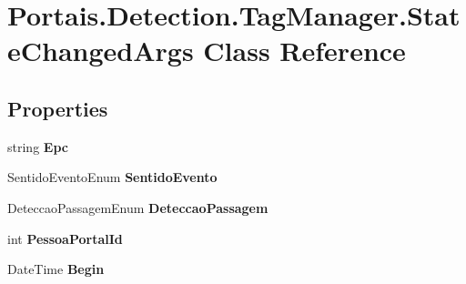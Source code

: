 \hypertarget{class_portais_1_1_detection_1_1_tag_manager_1_1_state_changed_args}{}\section{Portais.\+Detection.\+Tag\+Manager.\+State\+Changed\+Args Class Reference}
\label{class_portais_1_1_detection_1_1_tag_manager_1_1_state_changed_args}
\subsection*{Properties}
\begin{DoxyCompactItemize}
\item 
string {\bfseries Epc}\hypertarget{class_portais_1_1_detection_1_1_tag_manager_1_1_state_changed_args_ab162af2d831b001e3a7a2dbc318d6e7f}{}\label{class_portais_1_1_detection_1_1_tag_manager_1_1_state_changed_args_ab162af2d831b001e3a7a2dbc318d6e7f}

\item 
Sentido\+Evento\+Enum {\bfseries Sentido\+Evento}\hypertarget{class_portais_1_1_detection_1_1_tag_manager_1_1_state_changed_args_ad5ae6d50b904700d75226daad2cd1460}{}\label{class_portais_1_1_detection_1_1_tag_manager_1_1_state_changed_args_ad5ae6d50b904700d75226daad2cd1460}

\item 
Deteccao\+Passagem\+Enum {\bfseries Deteccao\+Passagem}\hypertarget{class_portais_1_1_detection_1_1_tag_manager_1_1_state_changed_args_a9c11a67657fe00c06f03f4910019065e}{}\label{class_portais_1_1_detection_1_1_tag_manager_1_1_state_changed_args_a9c11a67657fe00c06f03f4910019065e}

\item 
int {\bfseries Pessoa\+Portal\+Id}\hypertarget{class_portais_1_1_detection_1_1_tag_manager_1_1_state_changed_args_a93de763447b3f3cc88219b8e0e19b13d}{}\label{class_portais_1_1_detection_1_1_tag_manager_1_1_state_changed_args_a93de763447b3f3cc88219b8e0e19b13d}

\item 
Date\+Time {\bfseries Begin}\hypertarget{class_portais_1_1_detection_1_1_tag_manager_1_1_state_changed_args_a4c7e926554712bd912730058a9d192dd}{}\label{class_portais_1_1_detection_1_1_tag_manager_1_1_state_changed_args_a4c7e926554712bd912730058a9d192dd}


\end{DoxyCompactItemize}
